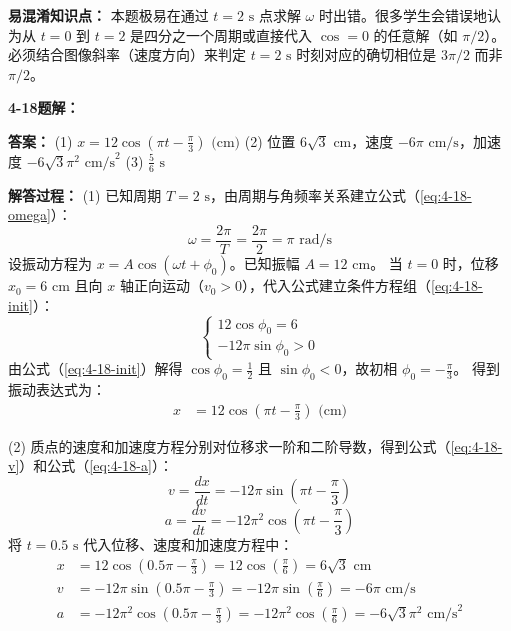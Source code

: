 \textbf{易混淆知识点： }
本题极易在通过 $t=2\text{ s}$ 点求解 $\omega$ 时出错。很多学生会错误地认为从 $t=0$ 到 $t=2$ 是四分之一个周期或直接代入 $\cos=0$ 的任意解（如 $\pi/2$）。必须结合图像斜率（速度方向）来判定 $t=2\text{ s}$ 时刻对应的确切相位是 $3\pi/2$ 而非 $\pi/2$。

\vspace{2em}

\textbf{4-18题解： }
\setcounter{equation}{0}
\renewcommand{\theHequation}{4-18.\arabic{equation}}

\textbf{答案： }
(1) $x = 12 \cos\left(\pi t - \frac{\pi}{3}\right) \text{ (cm)}$
(2) 位置 $6\sqrt{3} \text{ cm}$，速度 $-6\pi \text{ cm/s}$，加速度 $-6\sqrt{3}\pi^2 \text{ cm/s}^2$
(3) $\frac{5}{6} \text{ s}$

\textbf{解答过程： }
(1) 已知周期 $T = 2 \text{ s}$，由周期与角频率关系建立公式（\ref{eq:4-18-omega}）：
\begin{equation}\label{eq:4-18-omega}
	\omega = \frac{2\pi}{T} = \frac{2\pi}{2} = \pi \text{ rad/s}
\end{equation}
设振动方程为 $x = A \cos(\omega t + \phi_0)$。已知振幅 $A = 12 \text{ cm}$。
当 $t = 0$ 时，位移 $x_0 = 6 \text{ cm}$ 且向 $x$ 轴正向运动（$v_0 > 0$），代入公式建立条件方程组（\ref{eq:4-18-init}）：
\begin{equation}\label{eq:4-18-init}
	\begin{cases}
		12 \cos\phi_0 = 6 \\
		-12\pi \sin\phi_0 > 0
	\end{cases}
\end{equation}
由公式（\ref{eq:4-18-init}）解得 $\cos\phi_0 = \frac{1}{2}$ 且 $\sin\phi_0 < 0$，故初相 $\phi_0 = -\frac{\pi}{3}$。
得到振动表达式为：
\begin{align*}
	x &= 12 \cos\left(\pi t - \frac{\pi}{3}\right) \text{ (cm)}
\end{align*}

(2) 质点的速度和加速度方程分别对位移求一阶和二阶导数，得到公式（\ref{eq:4-18-v}）和公式（\ref{eq:4-18-a}）：
\begin{equation}\label{eq:4-18-v}
	v = \frac{dx}{dt} = -12\pi \sin\left(\pi t - \frac{\pi}{3}\right)
\end{equation}
\begin{equation}\label{eq:4-18-a}
	a = \frac{dv}{dt} = -12\pi^2 \cos\left(\pi t - \frac{\pi}{3}\right)
\end{equation}
将 $t = 0.5 \text{ s}$ 代入位移、速度和加速度方程中：
\begin{align*}
	x &= 12 \cos\left(0.5\pi - \frac{\pi}{3}\right) = 12 \cos\left(\frac{\pi}{6}\right) = 6\sqrt{3} \text{ cm} \\
	v &= -12\pi \sin\left(0.5\pi - \frac{\pi}{3}\right) = -12\pi \sin\left(\frac{\pi}{6}\right) = -6\pi \text{ cm/s} \\
	a &= -12\pi^2 \cos\left(0.5\pi - \frac{\pi}{3}\right) = -12\pi^2 \cos\left(\frac{\pi}{6}\right) = -6\sqrt{3}\pi^2 \text{ cm/s}^2
\end{align*}

